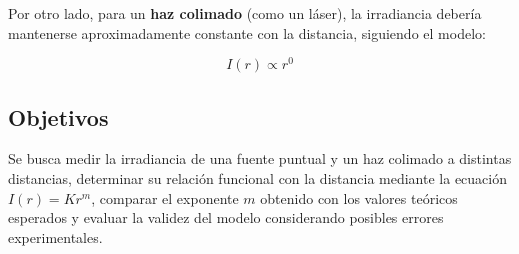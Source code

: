 Por otro lado, para un \textbf{haz colimado} (como un láser), la irradiancia debería mantenerse aproximadamente constante con la distancia, siguiendo el modelo:

\begin{mdframed}
\begin{equation}
    I(r) \propto r^{0}
\end{equation}
\end{mdframed}

\subsection{Objetivos}

Se busca medir la irradiancia de una fuente puntual y un haz colimado a distintas distancias, determinar su relación funcional con la distancia mediante la ecuación \( I(r) = K r^m \), comparar el exponente \( m \) obtenido con los valores teóricos esperados y evaluar la validez del modelo considerando posibles errores experimentales.